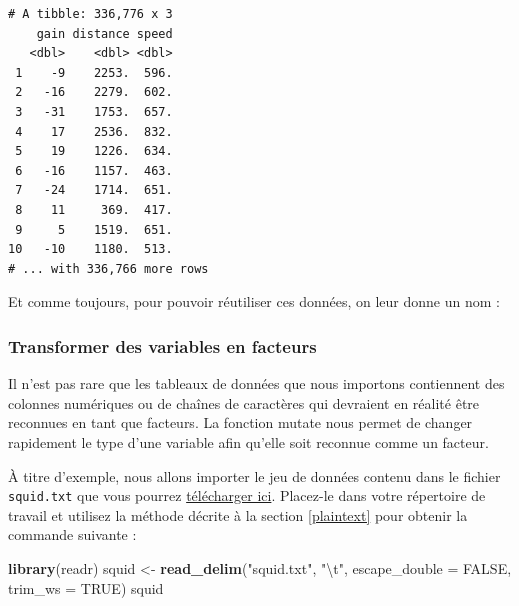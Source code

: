 \documentclass[a4paperpaper,]{article}
\newenvironment{Shaded}{\begin{snugshade}}{\end{snugshade}}
\newcommand{\CharTok}[1]{\textcolor[rgb]{0.57,0.30,0.62}{#1}}
\newcommand{\DataTypeTok}[1]{\textcolor[rgb]{0.00,0.34,0.68}{#1}}
\newcommand{\DecValTok}[1]{\textcolor[rgb]{0.69,0.50,0.00}{#1}}
\newcommand{\FloatTok}[1]{\textcolor[rgb]{0.69,0.50,0.00}{#1}}
\newcommand{\KeywordTok}[1]{\textcolor[rgb]{0.12,0.11,0.11}{\textbf{#1}}}
\newcommand{\NormalTok}[1]{\textcolor[rgb]{0.12,0.11,0.11}{#1}}
\newcommand{\OperatorTok}[1]{\textcolor[rgb]{0.12,0.11,0.11}{#1}}
\newcommand{\OtherTok}[1]{\textcolor[rgb]{0.00,0.43,0.16}{#1}}
\newcommand{\StringTok}[1]{\textcolor[rgb]{0.75,0.01,0.01}{#1}}
\theoremstyle{definition}
\theoremstyle{definition}
\theoremstyle{definition}
\theoremstyle{remark}
\begin{document}
\begin{verbatim}
# A tibble: 336,776 x 3
    gain distance speed
   <dbl>    <dbl> <dbl>
 1    -9    2253.  596.
 2   -16    2279.  602.
 3   -31    1753.  657.
 4    17    2536.  832.
 5    19    1226.  634.
 6   -16    1157.  463.
 7   -24    1714.  651.
 8    11     369.  417.
 9     5    1519.  651.
10   -10    1180.  513.
# ... with 336,766 more rows
\end{verbatim}

Et comme toujours, pour pouvoir réutiliser ces données, on leur donne un
nom :

\begin{Shaded}
\end{Shaded}

\hypertarget{transformer-des-variables-en-facteurs}{%
\subsubsection{Transformer des variables en
facteurs}\label{transformer-des-variables-en-facteurs}}

Il n'est pas rare que les tableaux de données que nous importons
contiennent des colonnes numériques ou de chaînes de caractères qui
devraient en réalité être reconnues en tant que facteurs. La fonction
mutate nous permet de changer rapidement le type d'une variable afin
qu'elle soit reconnue comme un facteur.

À titre d'exemple, nous allons importer le jeu de données contenu dans
le fichier \texttt{squid.txt} que vous pourrez
\href{data/squid.txt}{télécharger ici}. Placez-le dans votre répertoire
de travail et utilisez la méthode décrite à la section \ref{plaintext}
pour obtenir la commande suivante :

\begin{Shaded}
\begin{Highlighting}[]
\KeywordTok{library}\NormalTok{(readr)}
\NormalTok{squid <-}\StringTok{ }\KeywordTok{read_delim}\NormalTok{(}\StringTok{"squid.txt"}\NormalTok{, }\StringTok{"}\CharTok{\textbackslash{}t}\StringTok{"}\NormalTok{, }
    \DataTypeTok{escape_double =} \OtherTok{FALSE}\NormalTok{, }\DataTypeTok{trim_ws =} \OtherTok{TRUE}\NormalTok{)}
\NormalTok{squid}
\end{Highlighting}
\end{Shaded}
\end{document}
